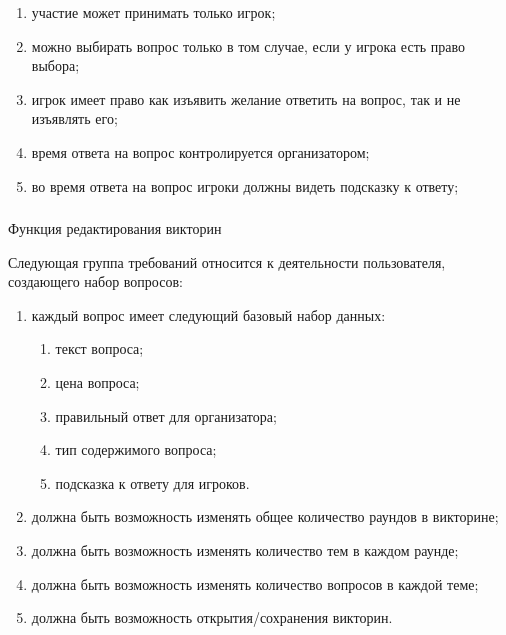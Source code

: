 \begin{enumerate}
	\item участие может принимать только игрок;
	\item можно выбирать вопрос только в том случае, если у игрока есть право выбора;
	\item игрок имеет право как изъявить желание ответить на вопрос, так и не изъявлять его;
	\item время ответа на вопрос контролируется организатором;
	\item во время ответа на вопрос игроки должны видеть подсказку к ответу;
\end{enumerate}

\subsubsection{} Функция редактирования викторин
\label{sec:domain:specification:edit}

Следующая группа требований относится к деятельности пользователя, создающего набор вопросов:

\begin{enumerate}
	\item каждый вопрос имеет следующий базовый набор данных:
	\begin{enumerate}
		\item текст вопроса;
		\item цена вопроса;
		\item правильный ответ для организатора;
		\item тип содержимого вопроса;
		\item подсказка к ответу для игроков.
	\end{enumerate}
	\item должна быть возможность изменять общее количество раундов в викторине; 
	\item должна быть возможность изменять количество тем в каждом раунде;
	\item должна быть возможность изменять количество вопросов в каждой теме;
	\item должна быть возможность открытия/сохранения викторин.
\end{enumerate}
